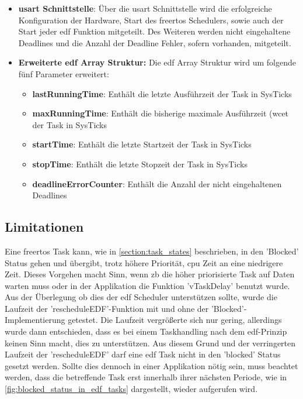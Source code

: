 \documentclass[../EDF Master Thesis.tex]{subfiles}
\begin{document}
    \begin{itemize}
        \item \textbf{\ac{usart} Schnittstelle}: Über die \ac{usart} Schnittstelle wird die erfolgreiche Konfiguration der Hardware, Start des \ac{freertos} Schedulers, sowie auch der Start jeder \ac{edf} Funktion mitgeteilt.
                                                 Des Weiteren werden nicht eingehaltene Deadlines und die Anzahl der Deadline Fehler, sofern vorhanden, mitgeteilt.
        \item \textbf{Erweiterte \ac{edf} Array Struktur:} Die \ac{edf} Array Struktur wird um folgende fünf Parameter erweitert:
        \begin{itemize}
            \item \textbf{lastRunningTime}: Enthält die letzte Ausführzeit der Task in SysTicks
            \item \textbf{maxRunningTime}: Enthält die bisherige maximale Ausführzeit (\ac{wcet} der Task in SysTicks
            \item \textbf{startTime}: Enthält die letzte Startzeit der Task in SysTicks
            \item \textbf{stopTime}: Enthält die letzte Stopzeit der Task in SysTicks
            \item \textbf{deadlineErrorCounter}: Enthält die Anzahl der nicht eingehaltenen Deadlines
        \end{itemize}
    \end{itemize}

\subsection{Limitationen} \label{section:limitationen}

    Eine \ac{freertos} Task kann, wie in \autoref{section:task_states} beschrieben, in den 'Blocked' Status gehen und übergibt, trotz höhere Priorität, \ac{cpu} Zeit an eine niedrigere Zeit.
    Dieses Vorgehen macht Sinn, wenn \ac{zb} die höher priorisierte Task auf Daten warten muss oder in der Applikation die Funktion 'vTaskDelay' benutzt wurde.
    Aus der Überlegung ob dies der \ac{edf} Scheduler unterstützen sollte, wurde die Laufzeit der 'rescheduleEDF'-Funktion mit und ohne der 'Blocked'-Implementierung getestet.
    Die Laufzeit vergrößerte sich nur gering, allerdings wurde dann entschieden, dass es bei einem Taskhandling nach dem \ac{edf}-Prinzip keinen Sinn macht, dies zu unterstützen.
    Aus diesem Grund und der verringerten Laufzeit der 'rescheduleEDF' darf eine \ac{edf} Task nicht in den 'blocked' Status gesetzt werden.  
    Sollte dies dennoch in einer Applikation nötig sein, muss beachtet werden, dass die betreffende Task erst innerhalb ihrer nächsten Periode, wie in \autoref{fig:blocked_status_in_edf_tasks} dargestellt, wieder aufgerufen wird.
\end{document}
